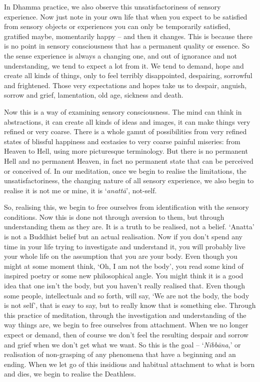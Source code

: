 In Dhamma practice, we also observe this unsatisfactoriness of sensory experience. Now just note in your own life that when you expect to be satisfied from sensory objects or experiences you can only be temporarily satisfied, gratified maybe, momentarily happy -- and then it changes. This is because there is no point in sensory consciousness that has a permanent quality or essence. So the sense experience is always a changing one, and out of ignorance and not understanding, we tend to expect a lot from it. We tend to demand, hope and create all kinds of things, only to feel terribly disappointed, despairing, sorrowful and frightened. Those very expectations and hopes take us to despair, anguish, sorrow and grief, lamentation, old age, sickness and death.

Now this is a way of examining sensory consciousness. The mind can think in abstractions, it can create all kinds of ideas and images, it can make things very refined or very coarse. There is a whole gamut of possibilities from very refined states of blissful happiness and ecstasies to very coarse painful miseries: from Heaven to Hell, using more picturesque terminology. But there is no permanent Hell and no permanent Heaven, in fact no permanent state that can be perceived or conceived of. In our meditation, once we begin to realise the limitations, the unsatisfactoriness, the changing nature of all sensory experience, we also begin to realise it is not me or mine, it is `\textit{anatt\=a}', not-self.

So, realising this, we begin to free ourselves from identification with the sensory conditions. Now this is done not through aversion to them, but through understanding them as they are. It is a truth to be realised, not a belief. `Anatta' is not a Buddhist belief but an actual realisation. Now if you don't spend any time in your life trying to investigate and understand it, you will probably live your whole life on the assumption that you are your body. Even though you might at some moment think, `Oh, I am not the body', you read some kind of inspired poetry or some new philosophical angle. You might think it is a good idea that one isn't the body, but you haven't really realised that. Even though some people, intellectuals and so forth, will say, `We are not the body, the body is not self', that is easy to say, but to really know that is something else. Through this practice of meditation, through the investigation and understanding of the way things are, we begin to free ourselves from attachment. When we no longer expect or demand, then of course we don't feel the resulting despair and sorrow and grief when we don't get what we want. So this is the goal -- `\textit{Nibb\=ana},' or realisation of non-grasping of any phenomena that have a beginning and an ending. When we let go of this insidious and habitual attachment to what is born and dies, we begin to realise the Deathless.

